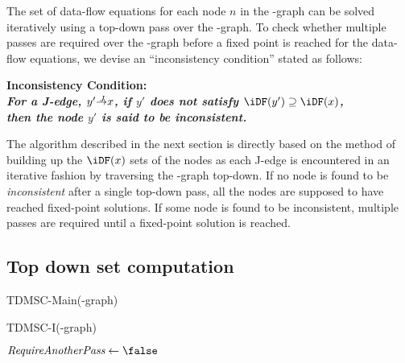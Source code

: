 {The set of data-flow equations for each node $n$ in the \DJ-graph can be solved iteratively using a top-down pass over the \DJ-graph. 
To check whether multiple passes are required over the \DJ-graph before a fixed point is reached for the data-flow equations, we devise an ``inconsistency condition'' stated as follows:

\begin{center} \bf{Inconsistency Condition:}\\ \it{For a J-edge, $y' \st{J} x$, if $y'$ does not satisfy $\iDF(y')\supseteq \iDF(x)$,\\ then the node $y'$ is said to be inconsistent}. 
\end{center}

The algorithm described in the next section is directly based on the method of building up the $\iDF(x)$ sets of the nodes as each J-edge is encountered in an iterative fashion by traversing the \DJ-graph top-down. 
If no node is found to be \emph{inconsistent} after a single top-down pass, all the nodes are supposed to have reached fixed-point solutions. 
If some node is found to be inconsistent, multiple passes are required until a fixed-point solution is reached.


\subsection{Top down \iDF set computation}

\begin{function}
  \caption{TDMSC-Main(\DJ-graph)}
  \label{proc:tdmscmain}
\end{function}

\begin{function}
  \caption{TDMSC-I(\DJ-graph)}
  \label{proc:alt:tdmscI}
  $\textit{RequireAnotherPass} \gets \false$\;

\end{function}



}
